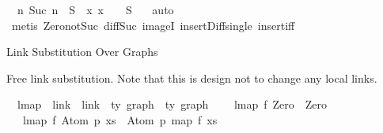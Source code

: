 \begin{isabellebody}
\ \ {\isachardoublequoteopen}{\isacharbraceleft}{\kern0pt}n{\isachardot}{\kern0pt}\ Suc\ n\ {\isasymin}\ S{\isacharbraceright}{\kern0pt}\ {\isacharequal}{\kern0pt}\ {\isacharparenleft}{\kern0pt}{\isasymlambda}x{\isachardot}{\kern0pt}\ x\ {\isacharminus}{\kern0pt}\ {}{\isacharparenright}{\kern0pt}\ {\isacharbackquote}{\kern0pt}\ {\isacharparenleft}{\kern0pt}S\ {\isacharminus}{\kern0pt}\ {\isacharbraceleft}{\kern0pt}{}{\isacharbraceright}{\kern0pt}{\isacharparenright}{\kern0pt}{\isachardoublequoteclose}\isanewline
%
\isadelimproof
%
\endisadelimproof
%
\isatagproof
{}\isamarkupfalse%
\ auto\isanewline
{}\isamarkupfalse%
\ {\isacharparenleft}{\kern0pt}metis\ Zero{\isacharunderscore}{\kern0pt}not{\isacharunderscore}{\kern0pt}Suc\ diff{\isacharunderscore}{\kern0pt}Suc{\isacharunderscore}{\kern0pt}{}{\isacharprime}{\kern0pt}\ imageI\ insert{\isacharunderscore}{\kern0pt}Diff{\isacharunderscore}{\kern0pt}single\ insert{\isacharunderscore}{\kern0pt}iff{\isacharparenright}{\kern0pt}%
\endisatagproof
{\isafoldproof}%
%
\isadelimproof
%
\endisadelimproof
%
\isadelimdocument
%
\endisadelimdocument
%
\isatagdocument
%
\isamarkuptrue%
%
\endisatagdocument
{\isafolddocument}%
%
\isadelimdocument
%
\endisadelimdocument
%
\begin{isamarkuptext}%
Link Substitution Over Graphs%
\end{isamarkuptext}\isamarkuptrue%
%
\begin{isamarkuptext}%
Free link substitution.
Note that this is design not to change any local links.%
\end{isamarkuptext}\isamarkuptrue%
\isamarkupfalse%
\isanewline
\ \ lmap\ {\isacharcolon}{\kern0pt}{\isacharcolon}{\kern0pt}\ {\isachardoublequoteopen}{\isacharparenleft}{\kern0pt}link\ {\isacharequal}{\kern0pt}{\isachargreater}{\kern0pt}\ link{\isacharparenright}{\kern0pt}\ {\isacharequal}{\kern0pt}{\isachargreater}{\kern0pt}\ {\isacharprime}{\kern0pt}ty\ graph\ {\isacharequal}{\kern0pt}{\isachargreater}{\kern0pt}\ {\isacharprime}{\kern0pt}ty\ graph{\isachardoublequoteclose}\isanewline
{}\isanewline
\ \ \ \ {\isachardoublequoteopen}lmap\ f\ Zero\ {\isacharequal}{\kern0pt}\ Zero{\isachardoublequoteclose}\isanewline
\ {\isacharbar}{\kern0pt}\ \ {\isachardoublequoteopen}lmap\ f\ {\isacharparenleft}{\kern0pt}Atom\ p\ xs{\isacharparenright}{\kern0pt}\ {\isacharequal}{\kern0pt}\ Atom\ p\ {\isacharparenleft}{\kern0pt}map\ f\ xs{\isacharparenright}{\kern0pt}{\isachardoublequoteclose}\isanewline

\end{isabellebody}
